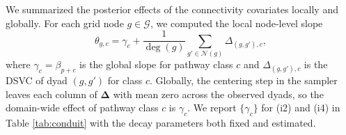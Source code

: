 \documentclass{article}
\begin{document}
We summarized the posterior effects of the connectivity covariates locally and globally.
For each grid node $g\in\mathcal{G}$, we computed the local node-level slope
$$\theta_{g,c}=\gamma_c+\frac{1}{\deg(g)}\sum_{g'\in\mathcal{N}(g)}\Delta_{(g,g'),c},$$
where $\gamma_c=\beta_{p+c}$ is the global slope for pathway class $c$ and $\Delta_{(g,g'),c}$ is the DSVC of dyad $(g,g')$ for class $c$.
Globally, the centering step in the sampler leaves each column of $\boldsymbol{\Delta}$ with mean zero across the observed dyads, so the domain-wide effect of pathway class $c$ is $\gamma_c$. We report $\{\gamma_c\}$ for (i2) and (i4) in Table \ref{tab:conduit} with the decay parameters both fixed and estimated.

\begin{table}
\caption{Posterior means of connectivity coefficients in the invaded range with 95\% credible intervals. Negative values facilitate gene flow. An asterisk marks an interval excluding zero.}
\label{tab:conduit}
\centering\footnotesize
\setlength{\tabcolsep}{4pt}
\end{table}
\end{document}
